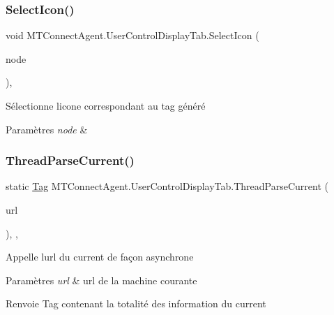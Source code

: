 \subsubsection{\texorpdfstring{Select\+Icon()}{SelectIcon()}}
{\footnotesize\ttfamily void M\+T\+Connect\+Agent.\+User\+Control\+Display\+Tab.\+Select\+Icon (\begin{DoxyParamCaption}\item[{Tree\+Node}]{node }\end{DoxyParamCaption})\hspace{0.3cm}{\ttfamily [inline]}, {\ttfamily [private]}}



Sélectionne l\textquotesingle{}icone correspondant au tag généré 


\begin{DoxyParams}{Paramètres}
{\em node} & \\
\hline
\end{DoxyParams}
\mbox{\label{class_m_t_connect_agent_1_1_user_control_display_tab_a1035636aa3d4084fdc2b8adde3fe5e3a}} 
\subsubsection{\texorpdfstring{Thread\+Parse\+Current()}{ThreadParseCurrent()}}
{\footnotesize\ttfamily static \mbox{\hyperlink{class_m_t_connect_agent_1_1_model_1_1_tag}{Tag}} M\+T\+Connect\+Agent.\+User\+Control\+Display\+Tab.\+Thread\+Parse\+Current (\begin{DoxyParamCaption}\item[{string}]{url }\end{DoxyParamCaption})\hspace{0.3cm}{\ttfamily [inline]}, {\ttfamily [static]}, {\ttfamily [private]}}



Appelle l\textquotesingle{}url du current de façon asynchrone 


\begin{DoxyParams}{Paramètres}
{\em url} & url de la machine courante\\
\hline
\end{DoxyParams}
\begin{DoxyReturn}{Renvoie}
Tag contenant la totalité des information du current
\end{DoxyReturn}
\mbox{\label{class_m_t_connect_agent_1_1_user_control_display_tab_ad1fd6a35a00d563b8515f464a3f60afc}} 
